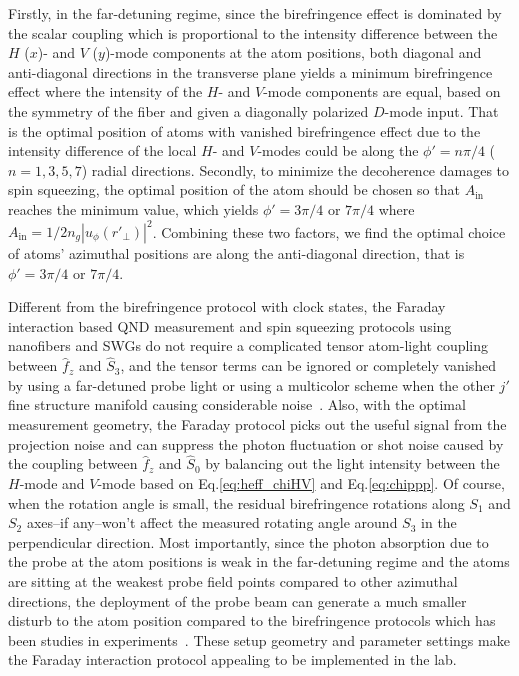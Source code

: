 \documentclass[aps,pra,twocolumn,superscriptaddress]{revtex4-1} %
\begin{document}
Firstly, in the far-detuning regime, since the birefringence effect is dominated by the scalar coupling which is proportional to the intensity difference between the $H$ ($x$)- and $V$ ($ y $)-mode components at the atom positions, both diagonal and anti-diagonal directions in the transverse plane yields a minimum birefringence effect where the intensity of the $ H $- and $ V $-mode components are equal, based on the symmetry of the fiber and given a diagonally polarized $ D $-mode input.
That is the optimal position of atoms with vanished birefringence effect due to the intensity difference of the local $ H $- and $ V $-modes could be along the $ \phi'=n\pi/4 $ ($ n=1,3,5,7 $) radial directions. 
Secondly, to minimize the decoherence damages to spin squeezing, the optimal position of the atom should be chosen so that $ A_{\mathrm{in}} $ reaches the minimum value, which yields $ \phi'=3\pi/4 $ or $ 7\pi/4 $ where $ A_{\mathrm{in}}=1/2n_g|u_\phi(r'\!_\perp)|^2 $.
Combining these two factors, we find the optimal choice of atoms' azimuthal positions are along the anti-diagonal direction, that is $\phi'=3\pi/4 $ or $ 7\pi/4 $.

Different from the birefringence protocol with clock states, the Faraday interaction based QND measurement and spin squeezing protocols using nanofibers and SWGs do not require a complicated tensor atom-light coupling between $ \hat{f}_z $ and $ \hat{S}_3 $, and the tensor terms can be ignored or completely vanished by using a far-detuned probe light or using a multicolor scheme when the other $ j' $ fine structure manifold causing considerable noise~\cite{Saffman2009}.
Also, with the optimal measurement geometry, the Faraday protocol picks out the useful signal from the projection noise and can suppress the photon fluctuation or shot noise caused by the coupling between $ \hat{f}_z $ and $ \hat{S}_0 $ by balancing out the light intensity between the $ H $-mode and $ V $-mode based on Eq.\eqref{eq:heff_chiHV} and Eq.\eqref{eq:chippp}.
Of course, when the rotation angle is small, the residual birefringence rotations along $ S_1 $ and $ S_2 $ axes--if any--won't affect the measured rotating angle around $ S_3 $ in the perpendicular direction.
Most importantly, since the photon absorption due to the probe at the atom positions is weak in the far-detuning regime and the atoms are sitting at the weakest probe field points compared to other azimuthal directions, the deployment of the probe beam can generate a much smaller disturb to the atom position compared to the birefringence protocols which has been studies in experiments~\cite{Solano2017Dynamics}. 
These setup geometry and parameter settings make the Faraday interaction protocol appealing to be implemented in the lab.
\end{document}
